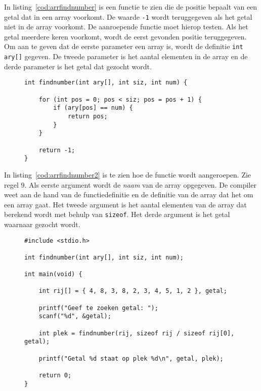 In listing~\ref{cod:arrfindnumber} is een functie te zien die de positie bepaalt van een getal dat in een array voorkomt. De waarde \texttt{-1} wordt teruggegeven als het getal niet in de array voorkomt. De aanroepende functie moet hierop testen. Als het getal meerdere keren voorkomt, wordt de eerst gevonden positie teruggegeven. Om aan te geven dat de eerste parameter een array is, wordt de definitie \texttt{int ary[]} gegeven. De tweede parameter is het aantal elementen in de array en de derde parameter is het getal dat gezocht wordt.

\begin{figure}[H]
\begin{lstlisting}[caption=Functie voor het vinden van een getal in een array.,label=cod:arrfindnumber]
int findnumber(int ary[], int siz, int num) {

    for (int pos = 0; pos < siz; pos = pos + 1) {
        if (ary[pos] == num) {
            return pos;
        }
    }
    
    return -1;
}
\end{lstlisting}
\end{figure}

In listing~\ref{cod:arrfindnumber2} is te zien hoe de functie wordt aangeroepen. Zie regel 9. Als eerste argument wordt de \textsl{naam} van de array opgegeven. De compiler weet aan de hand van de functiedefinitie en de definitie van de array dat het om een array gaat. Het tweede argument is het aantal elementen van de array dat berekend wordt met behulp van  \texttt{sizeof}. Het derde argument is het getal waarnaar gezocht wordt.

\begin{figure}[!ht]
\begin{lstlisting}[caption=Aanroepen van de functie \texttt{findnumber}.,label=cod:arrfindnumber2]
#include <stdio.h>

int findnumber(int ary[], int siz, int num);

int main(void) {

    int rij[] = { 4, 8, 3, 8, 2, 3, 4, 5, 1, 2 }, getal;

    printf("Geef te zoeken getal: ");
    scanf("%d", &getal);
    
    int plek = findnumber(rij, sizeof rij / sizeof rij[0], getal);

    printf("Getal %d staat op plek %d\n", getal, plek);

    return 0;
}
\end{lstlisting}
\end{figure}


